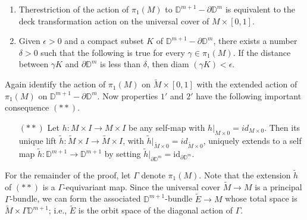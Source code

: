\begin{enumerate}[$1.'$]
\item The\pageoriginale restriction of the action of $\pi_1 (M)$ to
  $\mathbb{D}^{m+1}- \partial \mathbb{D}^m$ is equivalent to the deck
  transformation action on the universal cover of $M \times [0,1]$.
  \item Given $\epsilon > 0$ and a compact subset $K$ of
    $\mathbb{D}^{m+1}- \partial \mathbb{D}^m$, there exists a number
    $\delta > 0$ such that the following is true for every $\gamma \in
    \pi_1 (M)$. If the distance between $\gamma K$ and $\partial
    \mathbb{D}^m$ is less than $\delta$, then diam $(\gamma K)< \epsilon$. 
\end{enumerate}

Again identify the action of $\pi_1(M)$ on $\tilde{M} \times [0,1]$
with the extended action of $\pi_1(M)$ on $\mathbb{D}^{m+1}-\partial
\mathbb{D}^m$. Now properties $1'$ and $2'$ have the following
important consequence $(**)$.

\begin{itemize}
\item[$(**)$] Let $h: M \times I \to M \times I$ be any self-map with
  $h|_{M \times 0}= id_{M \times 0}$. Then its unique lift $\tilde{h}
  : \tilde{M}\times I \to \tilde{M} \times I$, with
  $\tilde{h}|_{\tilde{M}\times 0}= id_{\tilde{M} \times 0}$, uniquely
  extends to a self map $\tilde{h} : \mathbb{D}^{m+1} \to
  \mathbb{D}^{m+1}$ by setting $\tilde{h}|_{\partial \mathbb{D}^m}=
    \text{id}_{\partial \mathbb{D}^m}$.
\end{itemize}

For the remainder of the proof, let $\Gamma$ denote $\pi_1(M)$. Note
that the extension $\tilde{h}$ of $(**)$ is a $\Gamma$-equivariant
map. Since the universal cover $\tilde{M} \to M$ is a principal
$\Gamma$-bundle, we can form the associated $\mathbb{D}^{m+1}$-bundle
$\tilde{E} \to M$ whose total space is $\tilde{M} \times \Gamma
\mathbb{D}^{m+1}$; i.e., $\tilde{E}$ is the orbit space of the
diagonal action of $\Gamma$.

